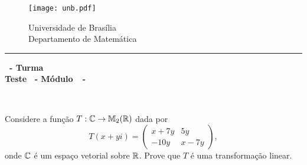 \documentclass[12pt]{exam}
\begin{document}
    \begin{figure}[h]
        \begin{minipage}[c]{1.7cm}
            \texttt{[image: unb.pdf]}
        \end{minipage}
        \hspace{0pt}
        \begin{minipage}[c]{4in}
            {Universidade de Brasília} \\
            {Departamento de Matemática}
        \end{minipage}
    \end{figure}
    \hrule
    \begin{center}
        {\Large\bf \disciplina\ - Turma \turma}  \\
         {\large\bf Teste \numeroteste\ - Módulo\ \modulo\ -\ \dataavaliacao}
    \end{center}

    \\
    \vspace*{.01cm}

    \vspace{.4cm}

    \questao{}  Considere a função $T : \mathbb{C} \to \mathbb{M}_2(\mathbb{R})$ dada por
  \[
      T(x + yi) = \begin{pmatrix}
                        x + 7y & 5y\\
                       -10y & x - 7y
                   \end{pmatrix},
  \]
    onde $\mathbb{C}$ é um espaço vetorial sobre $\mathbb{R}$. Prove que $T$ é uma transformação linear.
\end{document}
